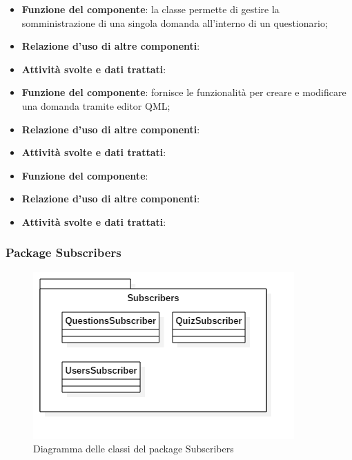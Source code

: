 
\begin{itemize}
	\item\textbf{Funzione del componente}: la classe permette di gestire la somministrazione di una singola domanda all'interno di un questionario;
	\item\textbf{Relazione d'uso di altre componenti}: 
	\item\textbf{Attività svolte e dati trattati}:
\end{itemize}


\begin{itemize}
	\item\textbf{Funzione del componente}: fornisce le funzionalità per creare e modificare una domanda tramite editor QML;
	\item\textbf{Relazione d'uso di altre componenti}: 
	\item\textbf{Attività svolte e dati trattati}:
\end{itemize}


\begin{itemize}
	\item\textbf{Funzione del componente}: 
	\item\textbf{Relazione d'uso di altre componenti}: 
	\item\textbf{Attività svolte e dati trattati}:
\end{itemize}

			\subsubsection{Package Subscribers}
\begin{figure}[h!]
\begin{center}
	\includegraphics[scale=0.65]{../images/SubscribersClass.png}
	\caption{Diagramma delle classi del package Subscribers}
\end{center}
\end{figure}

